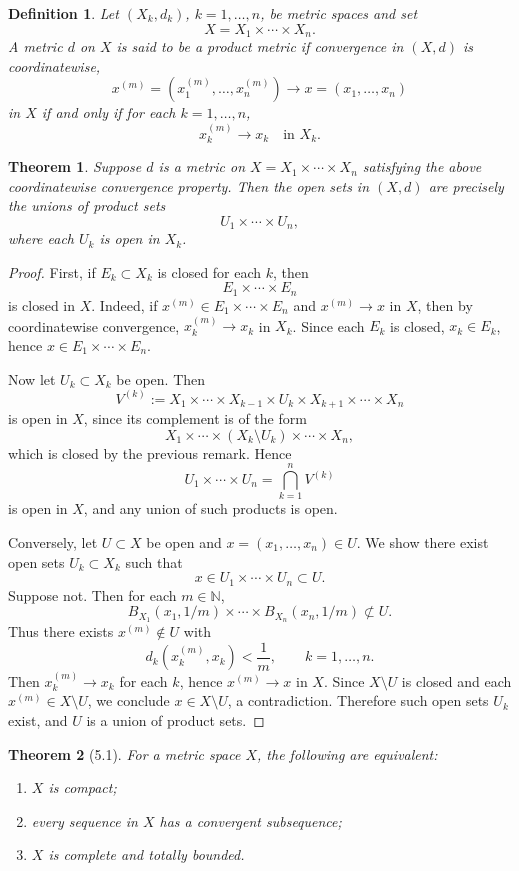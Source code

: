 \documentclass[12pt]{article}
\newtheorem{theorem}{Theorem}
\newtheorem{definition}{Definition}
\begin{document}
\begin{definition}
Let $(X_k,d_k)$, $k=1,\dots,n$, be metric spaces and set
\[
X = X_1 \times \cdots \times X_n.
\]
A metric $d$ on $X$ is said to be a \emph{product metric} if convergence in $(X,d)$ is coordinatewise,
\[
x^{(m)} = (x_1^{(m)},\dots,x_n^{(m)}) \to x=(x_1,\dots,x_n)
\]
in $X$ if and only if for each $k=1,\dots,n$,
\[
x_k^{(m)} \to x_k \quad \text{in } X_k.
\]
\end{definition}

\begin{theorem}
Suppose $d$ is a metric on $X=X_1\times\cdots\times X_n$ satisfying the above coordinatewise convergence property. Then the open sets in $(X,d)$ are precisely the unions of product sets
\[
U_1 \times \cdots \times U_n,
\]
where each $U_k$ is open in $X_k$.
\end{theorem}

\begin{proof}
First, if $E_k \subset X_k$ is closed for each $k$, then
\[
E_1 \times \cdots \times E_n
\]
is closed in $X$. Indeed, if $x^{(m)} \in E_1 \times \cdots \times E_n$ and $x^{(m)} \to x$ in $X$, then by coordinatewise convergence,
$x_k^{(m)} \to x_k$ in $X_k$. Since each $E_k$ is closed, $x_k \in E_k$, hence
$x \in E_1 \times \cdots \times E_n$.

Now let $U_k \subset X_k$ be open. Then
\[
V^{(k)} := X_1 \times \cdots \times X_{k-1} \times U_k \times X_{k+1} \times \cdots \times X_n
\]
is open in $X$, since its complement is of the form
\[
X_1 \times \cdots \times (X_k \setminus U_k) \times \cdots \times X_n,
\]
which is closed by the previous remark. Hence
\[
U_1 \times \cdots \times U_n
=
\bigcap_{k=1}^n V^{(k)}
\]
is open in $X$, and any union of such products is open.

Conversely, let $U \subset X$ be open and $x=(x_1,\dots,x_n)\in U$.
We show there exist open sets $U_k \subset X_k$ such that
\[
x \in U_1 \times \cdots \times U_n \subset U.
\]
Suppose not. Then for each $m\in\mathbb{N}$,
\[
B_{X_1}(x_1,1/m) \times \cdots \times B_{X_n}(x_n,1/m)
\not\subset U.
\]
Thus there exists $x^{(m)} \notin U$ with
\[
d_k(x_k^{(m)},x_k) < \frac1m, \qquad k=1,\dots,n.
\]
Then $x_k^{(m)} \to x_k$ for each $k$, hence $x^{(m)} \to x$ in $X$.
Since $X\setminus U$ is closed and each $x^{(m)} \in X\setminus U$,
we conclude $x \in X\setminus U$, a contradiction.
Therefore such open sets $U_k$ exist, and $U$ is a union of product sets.
\end{proof}

\begin{theorem}[5.1]
For a metric space $X$, the following are equivalent:
\begin{enumerate}[label=(\roman*)]
    \item $X$ is compact;
    \item every sequence in $X$ has a convergent subsequence;
    \item $X$ is complete and totally bounded.
\end{enumerate}
\end{theorem}
\end{document}
